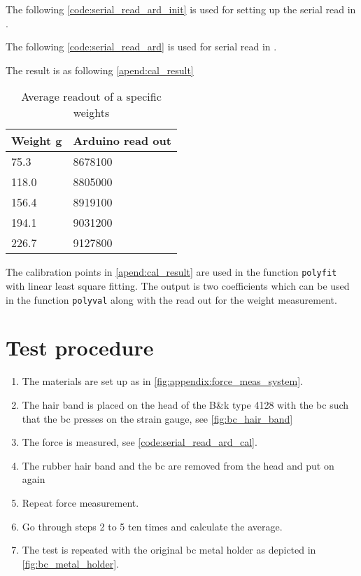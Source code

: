 The following \autoref{code:serial_read_ard_init} is used for setting up the serial read in \matlab.


The following \autoref{code:serial_read_ard} is used for serial read in \matlab.


The result is as following \autoref{apend:cal_result}

\begin{table}[H]
\centering
\caption{Average readout of a specific weights}
\label{apend:cal_result}
\begin{tabular}{l|l}
Weight \si{\gram} & Arduino read out \\ \hline
75.3              & 8678100          \\
118.0             & 8805000          \\
156.4             & 8919100          \\
194.1             & 9031200          \\
226.7             & 9127800         
\end{tabular}
\end{table}

The calibration points in \autoref{apend:cal_result} are used in the \matlab function \texttt{polyfit} with linear least square fitting. The output is two coefficients which can be used in the \matlab function \texttt{polyval} along with the read out for the weight measurement. 


\section*{Test procedure}


\begin{enumerate}
\item The materials are set up as in \autoref{fig:appendix:force_meas_system}.
\item The hair band is placed on the head of the B\&k type 4128 with the \gls{bc} such that the \gls{bc} presses on the strain gauge, see \autoref{fig:bc_hair_band}
\item The force is measured, see \autoref{code:serial_read_ard_cal}.
\item The rubber hair band and the \gls{bc} are removed from the head and put on again
\item Repeat force measurement.
\item  Go through steps 2 to 5 ten times and calculate the average.
\item  The test is repeated with the original \gls{bc} metal holder as depicted in \autoref{fig:bc_metal_holder}.
\end{enumerate}



